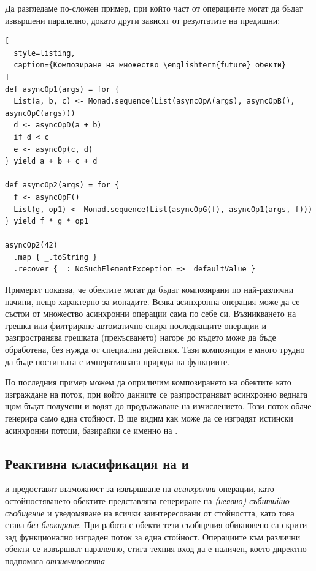 Да разгледаме по-сложен пример, при който част от операциите могат да бъдат извършени паралелно, докато други зависят от резултатите на предишни:

\begin{lstlisting}[
  style=listing,
  caption={Композиране на множество \englishterm{future} обекти}
]
def asyncOp1(args) = for {
  List(a, b, c) <- Monad.sequence(List(asyncOpA(args), asyncOpB(), asyncOpC(args)))
  d <- asyncOpD(a + b)
  if d < c
  e <- asyncOp(c, d)
} yield a + b + c + d

def asyncOp2(args) = for {
  f <- asyncOpF()
  List(g, op1) <- Monad.sequence(List(asyncOpG(f), asyncOp1(args, f)))
} yield f * g * op1

asyncOp2(42)
  .map { _.toString }
  .recover { _: NoSuchElementException =>  defaultValue }
\end{lstlisting}

Примерът показва, че  обектите могат да бъдат композирани по най-различни начини, нещо характерно за монадите. Всяка асинхронна операция може да се състои от множество асинхронни операции сама по себе си. Възникването на грешка или филтриране автоматично спира последващите операции и разпространява грешката (прекъсването) нагоре до където може да бъде обработена, без нужда от специални действия. Тази композиция е много трудно да бъде постигната с императивната природа на  функциите.

По последния пример можем да оприличим композирането на  обектите като изграждане на  поток, при който данните се разпространяват асинхронно веднага щом бъдат получени и водят до продължаване на изчислението. Този поток обаче генерира само една стойност. В  ще видим как може да се изградят истински асинхронни потоци, базирайки се именно на .

\subsection{Реактивна класификация на  и }

 и  предоставят възможност за извършване на \emph{асинхронни} операции, като остойностяването  обектите представлява генериране на \emph{(неявно) събитийно съобщение} и уведомяване на всички заинтересовани от стойността, като това става \emph{без блокиране}. При работа с  обекти тези съобщения обикновено са скрити зад функционално изграден  поток за една стойност. Операциите към различни  обекти се извършват паралелно, стига техния вход да е наличен, което директно подпомага \emph{отзивчивостта}

